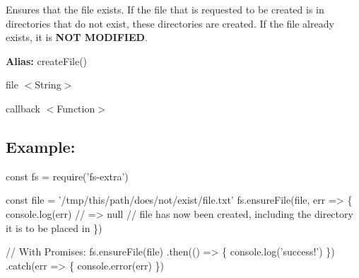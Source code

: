 Ensures that the file exists. If the file that is requested to be created is in directories that do not exist, these directories are created. If the file already exists, it is {\bfseries N\+OT M\+O\+D\+I\+F\+I\+ED}.

{\bfseries Alias\+:} {\ttfamily create\+File()}


\begin{DoxyItemize}
\item {\ttfamily file} {\ttfamily $<$String$>$}
\item {\ttfamily callback} {\ttfamily $<$Function$>$}
\end{DoxyItemize}

\subsection*{Example\+:}


\begin{DoxyCode}
const fs = require('fs-extra')

const file = '/tmp/this/path/does/not/exist/file.txt'
fs.ensureFile(file, err => \{
  console.log(err) // => null
  // file has now been created, including the directory it is to be placed in
\})

// With Promises:
fs.ensureFile(file)
.then(() => \{
  console.log('success!')
\})
.catch(err => \{
  console.error(err)
\})
\end{DoxyCode}
 